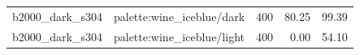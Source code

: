 \begin{longtable}{l>{\raggedright\arraybackslash}p{.42\linewidth}rrr}
b2000\_\allowbreak{}dark\_\allowbreak{}s304 & %
palette:wine\_\allowbreak{}iceblue/dark & %
400 & %
80.25 & %
99.39 \\ %

b2000\_\allowbreak{}dark\_\allowbreak{}s304 & %
palette:wine\_\allowbreak{}iceblue/light & %
400 & %
0.00 & %
54.10 \\ %


\end{longtable}
